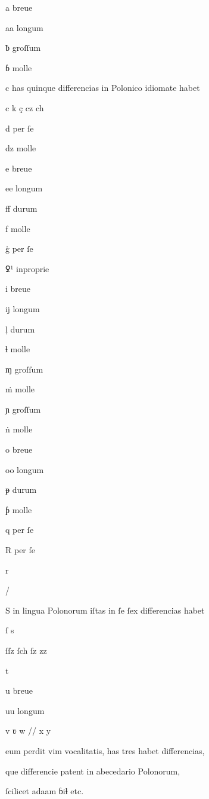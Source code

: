 {%

\newpage

\fulllines



a breue 

aa longum 

ƀ groſſum 

ɓ molle

c has quinque differencias in Polonico idiomate habet

c k ç cz ch

d per ſe 

dz molle 

e breue 

ee longum 

ﬀ durum 

f molle




ġ per ſe 

ꝿ¹  inproprie 

i breue 

ĳ longum 

ḷ durum 

ɬ molle 



ɱ groſſum 

ṁ molle 

ɲ  groſſum 

ṅ   molle 

o breue    

oo longum



ᵽ durum 

ƥ molle 

q per ſe

R per ſe 

r

/

S in lingua Polonorum iſtas in ſe ſex differencias habet        

ſ s 

ſſz ſch ſz zz

t 

u breue	

uu longum

v ʋ w // x y

eum perdit vim vocalitatis, has tres habet differencias, 

que differencie patent in abecedario Polonorum, 

ſcilicet adaam ɓiɬ etc.   



}

